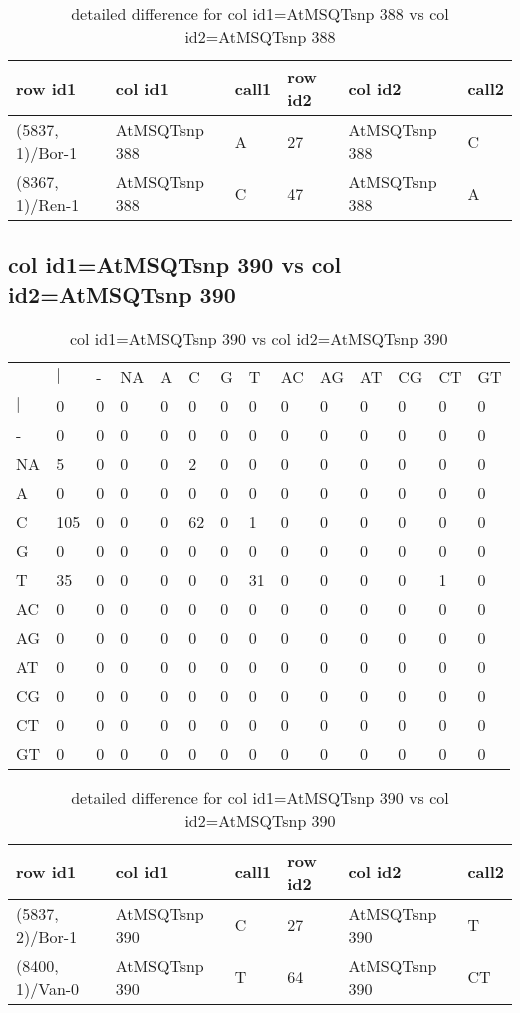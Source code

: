 \begin{center}
\begin{longtable}{|l|l|l|l|l|l|}
\caption{detailed difference for col id1=AtMSQTsnp 388 vs col id2=AtMSQTsnp 388} \label{table_dm699}\\
\hline
row id1&col id1&call1&row id2&col id2&call2\\
\hline
(5837, 1)/Bor-1&AtMSQTsnp 388&A&27&AtMSQTsnp 388&C\\
(8367, 1)/Ren-1&AtMSQTsnp 388&C&47&AtMSQTsnp 388&A\\
\hline
\end{longtable}
\end{center}

\subsection{col id1=AtMSQTsnp 390 vs col id2=AtMSQTsnp 390}
\begin{center}
\begin{longtable}{|l|l|l|l|l|l|l|l|l|l|l|l|l|l|}
\caption{col id1=AtMSQTsnp 390 vs col id2=AtMSQTsnp 390} \label{table_dm700}\\
\hline
\\
\hline
&$|$&-&NA&A&C&G&T&AC&AG&AT&CG&CT&GT\\
$|$&0&0&0&0&0&0&0&0&0&0&0&0&0\\
-&0&0&0&0&0&0&0&0&0&0&0&0&0\\
NA&5&0&0&0&2&0&0&0&0&0&0&0&0\\
A&0&0&0&0&0&0&0&0&0&0&0&0&0\\
C&105&0&0&0&62&0&1&0&0&0&0&0&0\\
G&0&0&0&0&0&0&0&0&0&0&0&0&0\\
T&35&0&0&0&0&0&31&0&0&0&0&1&0\\
AC&0&0&0&0&0&0&0&0&0&0&0&0&0\\
AG&0&0&0&0&0&0&0&0&0&0&0&0&0\\
AT&0&0&0&0&0&0&0&0&0&0&0&0&0\\
CG&0&0&0&0&0&0&0&0&0&0&0&0&0\\
CT&0&0&0&0&0&0&0&0&0&0&0&0&0\\
GT&0&0&0&0&0&0&0&0&0&0&0&0&0\\
\hline
\end{longtable}
\end{center}

\begin{center}
\begin{longtable}{|l|l|l|l|l|l|}
\caption{detailed difference for col id1=AtMSQTsnp 390 vs col id2=AtMSQTsnp 390} \label{table_dm701}\\
\hline
row id1&col id1&call1&row id2&col id2&call2\\
\hline
(5837, 2)/Bor-1&AtMSQTsnp 390&C&27&AtMSQTsnp 390&T\\
(8400, 1)/Van-0&AtMSQTsnp 390&T&64&AtMSQTsnp 390&CT\\
\hline
\end{longtable}
\end{center}

